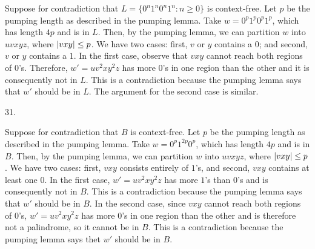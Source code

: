 Suppose for contradiction that $L = \{0^n 1^n 0^n 1^n : n \ge 0\}$
is context-free.
Let $p$ be the pumping length as described in the pumping lemma.
Take $w = 0^p 1^p 0^p 1^p$, which has length $4p$ and is in $L$.
Then, by the pumping lemma, we can partition $w$ into
$uvxyz$, where $\vert{vxy}\vert \le p$.
We have two cases: first, $v$ or $y$ contains a $0$;
and second, $v$ or $y$ contains a $1$.
In the first case, observe that $vxy$ cannot reach both regions of $0$'s.
Therefore, $w' = u v^2 x y^2 z$ has more $0$'s in one region
than the other and it is consequently not in $L$.
This is a contradiction because
the pumping lemma says that $w'$ should be in $L$.
The argument for the second case is similar.
\bigskip
\item{31.}

Suppose for contradiction that $B$ is context-free.
Let $p$ be the pumping length as described in the pumping lemma.
Take $w = 0^p 1^{2p} 0^p$, which has length $4p$ and is in $B$.
Then, by the pumping lemma, we can partition $w$ into
$uvxyz$, where $\vert{vxy}\vert \le p$.
We have two cases: first, $vxy$ consists entirely of $1$'s,
and second, $vxy$ contains at least one $0$.
In the first case, $w' = u v^2 x y^2 z$ has more $1$'s than $0$'s
and is consequently not in $B$.
This is a contradiction because the pumping lemma says that
$w'$ should be in $B$.
In the second case, since $vxy$ cannot reach both regions of $0$'s,
$w' = u v^2 x y^2 z$ has more $0$'s in one region than the other
and is therefore not a palindrome, so it cannot be in $B$.
This is a contradiction because the pumping lemma says thet $w'$
should be in $B$.
\bye
